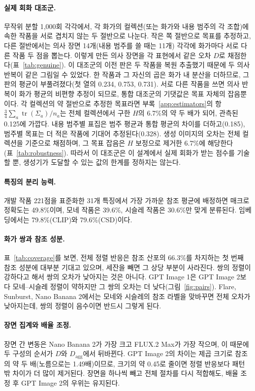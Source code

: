 \paragraph{실제 회화 대조군.} 무작위 분할 1,000회 각각에서, 각 화가의 컬렉션(또는 화가와 내용 범주의 각
조합)에 속한 작품을 서로 겹치지 않는 두 절반으로 나눈다. 작은 쪽 절반으로 목표를 추정하고, 다른 절반에서는
의사 장면 14개(내용 범주를 쓸 때는 11개) 각각에 화가마다 서로 다른 작품 두 점을 뽑는다. 이렇게 만든 의사
장면을 각 표현에서 같은 오차 $D$로 채점한다(표~\ref{tab:genuine}). 이 대조군의 이전 판은 두 작품을 복원
추출했기 때문에 두 의사 반복이 같은 그림일 수 있었다. 한 작품과 그 자신의 곱은 화가 내 분산을 더하므로,
그 판의 평균이 부풀려졌다(첫 열의 0.234, 0.753, 0.731). 서로 다른 작품을 쓰면 의사 반복이 화가 평균의
비편향 추정이 되므로, 통합 대조군의 기댓값은 목표 자체의 잡음뿐이다. 각 컬렉션의 약 절반으로 추정한
목표라면 부록~\ref{app:estimators}의 항 $\frac34\sum_a\operatorname{tr}(\Sigma_a)/n_a$는 전체 컬렉션에서
구한 $H$의 6.7\%의 약 두 배가 되어, 관측된 0.125에 가깝다. 내용 범주별 표집은 범주 평균과 통합 평균의
차이를 더하고(0.185), 범주별 목표는 더 적은 작품에 기대어 추정된다(0.328). 생성 이미지의 오차는 전체
컬렉션을 기준으로 채점하며, 그 목표 잡음은 $H$ 보정으로 제거한 6.7\%에 해당한다(표~\ref{tab:robustness}).
따라서 이 대조군은 이 설계에서 실제 회화가 받는 점수를 기술할 뿐, 생성기가 도달할 수 있는 값의 한계를
정하지는 않는다.

\paragraph{특징의 분리 능력.} 개발 작품 221점을 표준화한 31개 특징에서 가장 가까운 참조 평균에 배정하면
매크로 정확도는 49.8\%이며, 모네 작품은 39.6\%, 시슬레 작품은 30.6\%만 맞게 분류된다. 임베딩에서는
79.8\%(CLIP)와 79.6\%(CSD)이다.

\paragraph{화가 쌍과 참조 성분.} 표~\ref{tab:coverage}를 보면, 전체 정렬 반응은 참조 산포의 66.3\%를
차지하는 첫 번째 참조 성분에 대부분 기대고 있으며, 세잔을 빼면 그 상당 부분이 사라진다. 쌍의 정렬이
강하다고 해서 쌍의 오차가 낮아지는 것은 아니다. GPT Image 1은 GPT Image 2보다 모네--시슬레 정렬이
약하지만 그 쌍의 오차는 더 낮다(그림~\ref{fig:pairs}). Flare, Sunburst, Nano Banana 2에서는 모네와
시슬레의 참조 라벨을 맞바꾸면 전체 오차가 낮아지는데, 쌍의 정렬이 음수이면 반드시 그렇게 된다.

\paragraph{장면 집계와 배율 조정.} 장면 간 변동은 Nano Banana 2가 가장 크고 FLUX.2 Max가 가장 작으며,
이 때문에 두 구성의 순서가 $D$와 $D_{\mathrm{agg}}$에서 뒤바뀐다. GPT Image 2의 차이는 제곱 크기로
참조의 약 두 배(노름으로는 1.49배)이므로, 크기의 약 0.45로 줄이면 정렬 반응보다 패턴 밖 차이가 더 많이
제거된다. 장면을 하나씩 빼고 전체 절차를 다시 적합해도, 배율 조정 후 GPT Image 2의 우위는 유지된다.

